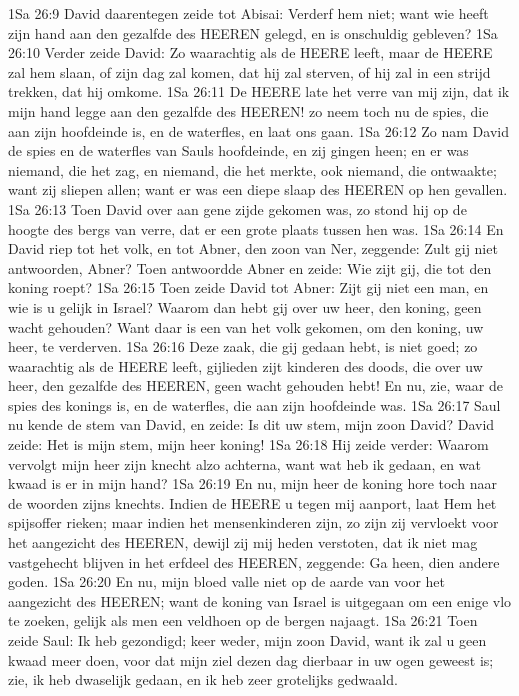 1Sa 26:9  David daarentegen zeide tot Abisai: Verderf hem niet; want wie heeft zijn hand aan den gezalfde des HEEREN gelegd, en is onschuldig gebleven?
1Sa 26:10  Verder zeide David: Zo waarachtig als de HEERE leeft, maar de HEERE zal hem slaan, of zijn dag zal komen, dat hij zal sterven, of hij zal in een strijd trekken, dat hij omkome.
1Sa 26:11  De HEERE late het verre van mij zijn, dat ik mijn hand legge aan den gezalfde des HEEREN! zo neem toch nu de spies, die aan zijn hoofdeinde is, en de waterfles, en laat ons gaan.
1Sa 26:12  Zo nam David de spies en de waterfles van Sauls hoofdeinde, en zij gingen heen; en er was niemand, die het zag, en niemand, die het merkte, ook niemand, die ontwaakte; want zij sliepen allen; want er was een diepe slaap des HEEREN op hen gevallen.
1Sa 26:13  Toen David over aan gene zijde gekomen was, zo stond hij op de hoogte des bergs van verre, dat er een grote plaats tussen hen was.
1Sa 26:14  En David riep tot het volk, en tot Abner, den zoon van Ner, zeggende: Zult gij niet antwoorden, Abner? Toen antwoordde Abner en zeide: Wie zijt gij, die tot den koning roept?
1Sa 26:15  Toen zeide David tot Abner: Zijt gij niet een man, en wie is u gelijk in Israel? Waarom dan hebt gij over uw heer, den koning, geen wacht gehouden? Want daar is een van het volk gekomen, om den koning, uw heer, te verderven.
1Sa 26:16  Deze zaak, die gij gedaan hebt, is niet goed; zo waarachtig als de HEERE leeft, gijlieden zijt kinderen des doods, die over uw heer, den gezalfde des HEEREN, geen wacht gehouden hebt! En nu, zie, waar de spies des konings is, en de waterfles, die aan zijn hoofdeinde was.
1Sa 26:17  Saul nu kende de stem van David, en zeide: Is dit uw stem, mijn zoon David? David zeide: Het is mijn stem, mijn heer koning!
1Sa 26:18  Hij zeide verder: Waarom vervolgt mijn heer zijn knecht alzo achterna, want wat heb ik gedaan, en wat kwaad is er in mijn hand?
1Sa 26:19  En nu, mijn heer de koning hore toch naar de woorden zijns knechts. Indien de HEERE u tegen mij aanport, laat Hem het spijsoffer rieken; maar indien het mensenkinderen zijn, zo zijn zij vervloekt voor het aangezicht des HEEREN, dewijl zij mij heden verstoten, dat ik niet mag vastgehecht blijven in het erfdeel des HEEREN, zeggende: Ga heen, dien andere goden.
1Sa 26:20  En nu, mijn bloed valle niet op de aarde van voor het aangezicht des HEEREN; want de koning van Israel is uitgegaan om een enige vlo te zoeken, gelijk als men een veldhoen op de bergen najaagt.
1Sa 26:21  Toen zeide Saul: Ik heb gezondigd; keer weder, mijn zoon David, want ik zal u geen kwaad meer doen, voor dat mijn ziel dezen dag dierbaar in uw ogen geweest is; zie, ik heb dwaselijk gedaan, en ik heb zeer grotelijks gedwaald.
